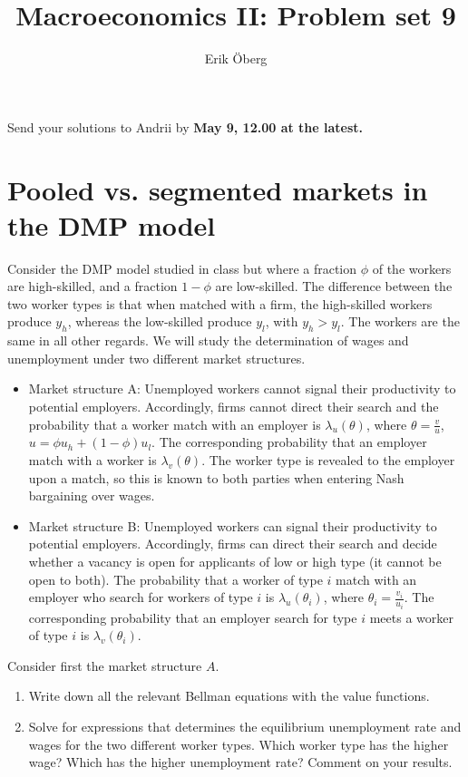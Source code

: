 \documentclass[11pt]{article}
\title{Macroeconomics II: Problem set 9}
\author{Erik \"{O}berg}
\date{}
\newcommand{\bit}{\begin{itemize}}
\newcommand{\eit}{\end{itemize}}
\newcommand{\ben}{\begin{enumerate}}
\newcommand{\een}{\end{enumerate}}
\begin{document}
\maketitle

Send your solutions to Andrii by \bf May 9, 12.00 \normalfont at the latest.

\section{Pooled vs. segmented markets in the DMP model}
Consider the DMP model studied in class but where a fraction $\phi$ of the workers are high-skilled, and a fraction $1-\phi$ are low-skilled. The difference between the two worker types is that when matched with a firm, the high-skilled workers produce $y_h$, whereas the low-skilled produce $y_l$, with $y_h>y_l$. The workers are the same in all other regards. We will study the determination of wages and unemployment under two different market structures.
\bit
	\item Market structure A: Unemployed workers cannot signal their productivity to potential employers. Accordingly, firms cannot direct their search and the probability that a worker match with an employer is $\lambda_u(\theta)$, where $\theta=\frac{v}{u}$, $u=\phi u_h +(1-\phi)u_l$. The corresponding probability that an employer match with a worker is $\lambda_v(\theta)$. The worker type is revealed to the employer upon a match, so this is known to both parties when entering Nash bargaining over wages.
	
	\item Market structure B: Unemployed workers can signal their productivity to potential employers. Accordingly, firms can direct their search and decide whether a vacancy is open for applicants of low or high type (it cannot be open to both). The probability that a worker of type $i$ match with an employer who search for workers of type $i$ is $\lambda_u(\theta_i)$, where $\theta_i=\frac{v_i}{u_i}$. The corresponding probability that an employer search for type $i$ meets a worker of type $i$ is $\lambda_v(\theta_i)$.
\eit 

Consider first the market structure $A$.
\ben
	\item Write down all the relevant Bellman equations with the value functions.
	
	\item Solve for expressions that determines the equilibrium unemployment rate and wages for the two different worker types. Which worker type has the higher wage? Which has the higher unemployment rate? Comment on your results.
\een
\end{document}
